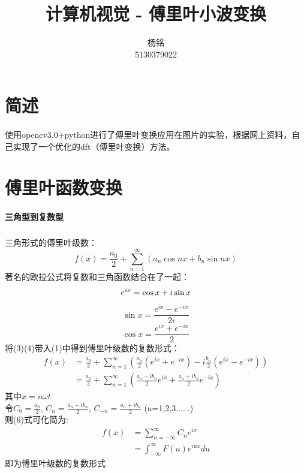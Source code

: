 \documentclass{article}
\author{杨铭\\5130379022}
\title{计算机视觉 - 傅里叶小波变换}
\begin{document}
    \maketitle
    \tableofcontents
    \section{简述}
    \paragraph{}
    使用opencv3.0+python进行了傅里叶变换应用在图片的实验，根据网上资料，自己实现了一个优化的dft（傅里叶变换）方法。
    \section{傅里叶函数变换}
    \paragraph{三角型到复数型}
        \subparagraph{}
        三角形式的傅里叶级数：
        \begin{equation}
        f(x)=\frac{a_0}{2}+\sum_{n=1}^{\infty}(a_n\cos nx+b_n\sin nx)
        \end{equation}
        著名的欧拉公式将复数和三角函数结合在了一起：
        \begin{equation}
        e^{ix}=\cos x + i\sin x \\
        \end{equation}
        \begin{equation}
        \sin x = \frac{e^{ix}-e^{-ix}}{2i}
        \end{equation}
        \begin{equation}
        \cos x = \frac{e^{ix}+e^{-ix}}{2}
        \end{equation}
        将(3)(4)带入(1)中得到傅里叶级数的复数形式：
        \begin{align}
        f(x) & =  \frac{a_0}{2}+\sum_{n=1}^{\infty}(\frac{a_n}{2}(e^{ix}+e^{-ix})-i\frac{b_n}{2}(e^{ix}-e^{-ix}))\\
             & =  \frac{a_0}{2}+\sum_{n=1}^{\infty}(\frac{a_n-ib_n}{2}e^{ix}+\frac{a_n+ib_n}{2}e^{-ix})
        \end{align}
        其中$x=n\omega t$\\
        令$C_0=\frac{a_0}{2}$, $C_n=\frac{a_n-ib_n}{2}$, $C_{-n}=\frac{a_n+ib_n}{2}$ (n=1,2,3......)\\
        则(6)式可化简为:\\
        \begin{align}
        f(x) & = \sum_{n=-\infty}^{\infty}C_ne^{ix} \\
             & = \int_{-\infty}^{\infty}F(u)e^{iux}du
        \end{align}
        即为傅里叶级数的复数形式
\end{document}
